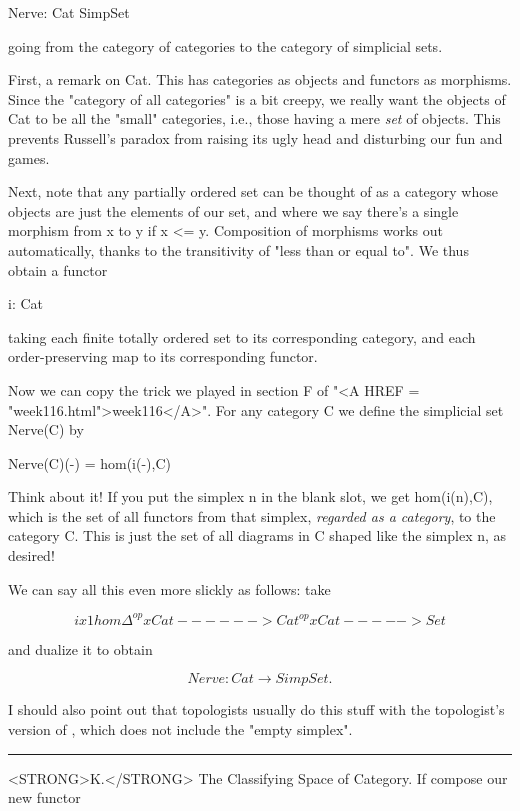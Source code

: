 Nerve: Cat \to  SimpSet

going from the category of categories to the category of simplicial
sets.  

First, a remark on Cat.  This has categories as objects and functors
as morphisms.  Since the "category of all categories" is a bit
creepy, we really want the objects of Cat to be all the "small" 
categories, i.e., those having a mere \emph{set} of objects.  This 
prevents Russell's paradox from raising its ugly head and disturbing
our fun and games.  

Next, note that any partially ordered set can be thought of as a
category whose objects are just the elements of our set, and where we
say there's a single morphism from x to y if x <= y.  Composition of
morphisms works out automatically, thanks to the transitivity of "less
than or equal to".  We thus obtain a functor

i: \Delta  \to  Cat

taking each finite totally ordered set to its corresponding category,
and each order-preserving map to its corresponding functor.

Now we can copy the trick we played in section F of "<A HREF = "week116.html">week116</A>".  For any
category C we define the simplicial set Nerve(C) by

                 Nerve(C)(-) = hom(i(-),C) 

Think about it!  If you put the simplex n in the blank slot, we
get hom(i(n),C), which is the set of all functors from that simplex,
\emph{regarded as a category}, to the category C.  This is just the
set of all diagrams in C shaped like the simplex n, as desired!

We can say all this even more slickly as follows: take


$$

                               i x 1                  hom
                 \Delta ^{op} x Cat ------> Cat^{op} x Cat -----> Set
$$
    
and dualize it to obtain


$$

                 Nerve: Cat \to  SimpSet.
$$
    
I should also point out that topologists usually do this stuff with
the topologist's version of \Delta , which does not include the "empty
simplex".  

\par\noindent\rule{\textwidth}{0.4pt}
<STRONG>K.</STRONG>  The Classifying Space of Category.  
If compose our new functor

